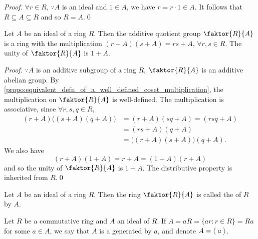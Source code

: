 \begin{proof}
  $\forall r \in R$, $\because A$ is an ideal and $1 \in A$, we have $r = r \cdot 1 \in A$. It follows that $R \subseteq A \subseteq R$ and so $R = A$.\qed
\end{proof}

\begin{propo}
\label{propo:construction_of_the_quotient_ring}
Let $A$ be an ideal of a ring $R$. Then the additive quotient group $\faktor{R}{A}$ is a ring with the multiplication $(r + A)(s + A) = rs + A$, $\forall r, s \in R$. The unity of $\faktor{R}{A}$ is $1 + A$.
\end{propo}

\begin{proof}
  $\because A$ is an additive subgroup of a ring $R$, $\faktor{R}{A}$ is an additive abelian group. By \cref{propo:equivalent_defn_of_a_well_defined_coset_multiplication}, the multiplication on $\faktor{R}{A}$ is well-defined. The multiplication is associative, since $\forall r, s, q \in R$,
  \begin{align*}
    (r + A)\big( (s + A)(q + A) \big) &= (r + A) ( sq + A ) = (rsq + A) \\
                                      &= (rs + A)(q + A) \\
                                      &= \big( (r + A)(s + A) \big)(q + A).
  \end{align*}
  We also have
  \begin{equation*}
    (r + A)(1 + A) = r + A = (1 + A)(r + A)
  \end{equation*}
  and so the unity of $\faktor{R}{A}$ is $1 + A$. The distributive property is inherited from $R$.\qed
\end{proof}

\begin{defn}
\label{defn:quotient_ring}
  Let $A$ be an ideal of a ring $R$. Then the ring $\faktor{R}{A}$ is called the  of $R$ by $A$.
\end{defn}

\begin{defn}
\label{defn:principal_ideal}
Let $R$ be a commutative ring and $A$ an ideal of $R$. If $A = aR = \{ ar : r \in R \} = Ra$ for some $a \in A$, we say that $A$ is a  \textcolor{base16-eighties-blue}{generated} by $a$, and denote $A = \langle \; a \; \rangle$.
\end{defn}

